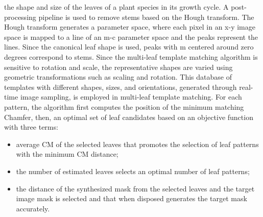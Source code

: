 the shape and size of the leaves of a plant species in its growth cycle. A post-processing pipeline is used to remove stems based on the Hough
transform. The Hough transform generates a parameter space, where each pixel in an x-y image space is mapped to a line of an m-c parameter space
and the peaks represent the lines. Since the canonical leaf shape is used, peaks with m centered around zero degrees correspond to stems. Since
the multi-leaf template matching algorithm is sensitive to rotation and scale, the representative shapes are varied using geometric transformations
such as scaling and rotation. This database of templates with different shapes, sizes, and orientations, generated through real-time image sampling,
is employed in multi-leaf template matching. For each pattern, the algorithm first computes the position of the minimum matching Chamfer, then, an
optimal set of leaf candidates based on an objective function with three terms: 
\begin{itemize}
    \item average CM of the selected leaves that promotes the selection of leaf patterns with the minimum CM distance;
    \item the number of estimated leaves selects an optimal number of leaf patterns; 
    \item the distance of the synthesized mask from the selected leaves and the target image mask is selected and that when disposed generates the target mask accurately.
\end{itemize}

